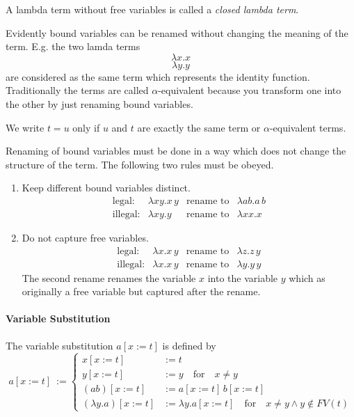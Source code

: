 \begin{definition}
  A lambda term without free variables is called a \emph{closed lambda term}.
\end{definition}

Evidently bound variables can be renamed without changing the meaning of the
term. E.g. the two lamda terms
$$\lambda x. x $$
$$\lambda y. y  $$
are considered as the same term which represents the identity
function. Traditionally the terms are called $\alpha$-equivalent because you
transform one into the other by just renaming bound variables.

We write $t = u$ only if $u$ and $t$ are exactly the same term or
$\alpha$-equivalent terms.

Renaming of bound variables must be done in a way which does not change the
structure of the term. The following two rules must be obeyed.
\begin{enumerate}

\item Keep different bound variables distinct.
  $$\begin{array}{llll}
      \text{legal:} & \lambda x y. x\, y  &  \text{rename to}  & \lambda a
                                                                 b. a\, b \\
      \text{illegal:} & \lambda x y. y      &  \text{rename to}  & \lambda x
                                                                   x. x
    \end{array} $$

\item Do not capture free variables.
  $$\begin{array}{llll}
      \text{legal:} & \lambda x. x\, y  &  \text{rename to}  & \lambda z. z\,y
                                                                \\
      \text{illegal:} & \lambda x. x\,y &  \text{rename to}  & \lambda y. y\,y
    \end{array} $$
    The second rename renames the variable $x$ into the variable $y$ which as
    originally a free variable but captured after the rename.
\end{enumerate}


\paragraph{Variable Substitution}

\begin{definition}
  The variable substitution $a[x:=t]$ is defined by
  $$a[x:=t]~:=
  \begin{cases} x[x:=t]  &:= t \\
    y[x:=t] &:= y \quad \text{for}\quad x \ne y \\
    (a b)[x:=t] &:= a[x:=t] \, b[x:=t] \\
    (\lambda y.a)[x:=t]  &:= \lambda y. a[x:=t] \quad\text{for}\quad x \ne y
    \land y \notin FV(t)
   \end{cases}
   $$
\end{definition}

